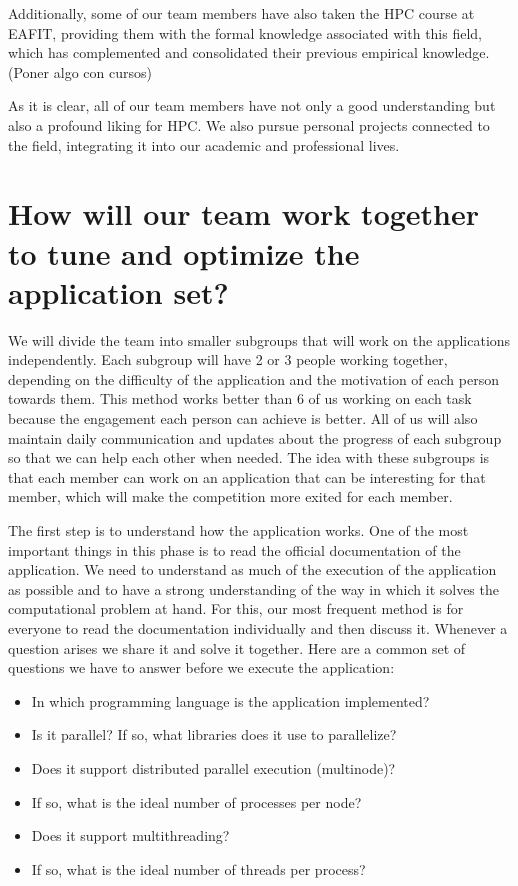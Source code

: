 \documentclass[11pt,a4paper,twocolumn]{article}
\begin{document}
Additionally, some of our team members have also taken the HPC course at EAFIT, providing them with the formal knowledge associated with this field, which has complemented and consolidated their previous empirical knowledge. (Poner algo con cursos)

As it is clear, all of our team members have not only a good understanding but also a profound liking for HPC. We also pursue personal projects connected to the field, integrating it into our academic and professional lives.


\section{How will our team work together to tune and optimize the application set?}

We will divide the team into smaller subgroups that will work on the applications independently. Each subgroup will have 2 or 3 people working together, depending on the difficulty of the application and the motivation of each person towards them. This method works better than 6 of us working on each task because the engagement each person can achieve is better. All of us will also maintain daily communication and updates about the progress of each subgroup so that we can help each other when needed. The idea with these subgroups is that each member can work on an application that can be interesting for that member, which will make the competition more exited for each member.

The first step is to understand how the application works. One of the most important things in this phase is to read the official documentation of the application. We need to understand as much of the execution of the application as possible and to have a strong understanding of the way in which it solves the computational problem at hand. For this, our most frequent method is for everyone to read the documentation individually and then discuss it. Whenever a question arises we share it and solve it together. Here are a common set of questions we have to answer before we execute the application:
\begin{itemize}
	\item In which programming language is the application implemented?
	\item Is it parallel? If so, what libraries does it use to parallelize?
	\item Does it support distributed parallel execution (multinode)?
	\item If so, what is the ideal number of processes per node?
	\item Does it support multithreading?
	\item If so, what is the ideal number of threads per process?
\end{itemize}
\end{document}
